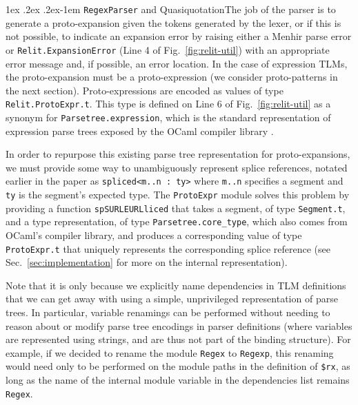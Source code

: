 \documentclass[acmsmall,screen]{acmart}
\makeatletter
\renewcommand{\subsubsection}{%
  \@startsection{subsubsection}{3}%
  {\z@}{1ex \@plus .2ex \@minus .2ex}{-1em}%
  {\sffamily\normalsize\itshape\maybe@addperiod}%
}
\newcommand{\maybe@addperiod}[1]{%
  #1\@addpunct{.}%
}
\newcommand{\li}[1]{\lstinline[basicstyle=\ttfamily\fontsize{9pt}{1em}\selectfont]{#1}}
\makeatother
\begin{document}
\subsubsection{\li{RegexParser} and Quasiquotation}\label{sec:regexparser}The job of the parser is to generate a proto-expansion given the tokens generated by the lexer, or if this is not possible, to indicate an expansion error by raising either a Menhir parse error or \li{Relit.ExpansionError} (Line 4 of Fig.~\ref{fig:relit-util}) with an appropriate error message and, if possible, an error location. In the case of expression TLMs, the proto-expansion must be a proto-expression (we consider proto-patterns in the next section). Proto-expressions are encoded as values of type \li{Relit.ProtoExpr.t}. This type is defined on Line 6 of Fig.~\ref{fig:relit-util} as a synonym for \li{Parsetree.expression}, which is the standard representation of expression parse trees exposed by the OCaml compiler library \cite{ocaml-manual}.%

In order to repurpose this existing parse tree representation for proto-expansions, we must provide some way to unambiguously represent splice references, notated earlier in the paper as \li{spliced<m..n : ty>} where \li{m..n} specifies a segment and \li{ty} is the segment's expected type. The \li{ProtoExpr} module solves this problem by providing a function \li{spSURLEURLliced} that takes a segment, of type \li{Segment.t}, and a type representation, of type \li{Parsetree.core_type}, which also comes from OCaml's compiler library, and produces a corresponding value of type \li{ProtoExpr.t} that uniquely represents the corresponding splice reference (see Sec.~\ref{sec:implementation} for more on the internal representation).

Note that it is only because we explicitly name dependencies in TLM definitions that we can get away with using a simple, unprivileged representation of parse trees. In particular, 
variable renamings can be performed without needing to reason about or modify parse tree encodings in parser definitions (where variables are represented using strings, and are thus not part of the binding structure). For example, if we decided to rename the module \li{Regex} to \li{Regexp}, this renaming would need only to be performed on the module paths in the definition of \li{$rx}, as long as the name of the internal module variable in the dependencies list remains \li{Regex}. 
\end{document}
